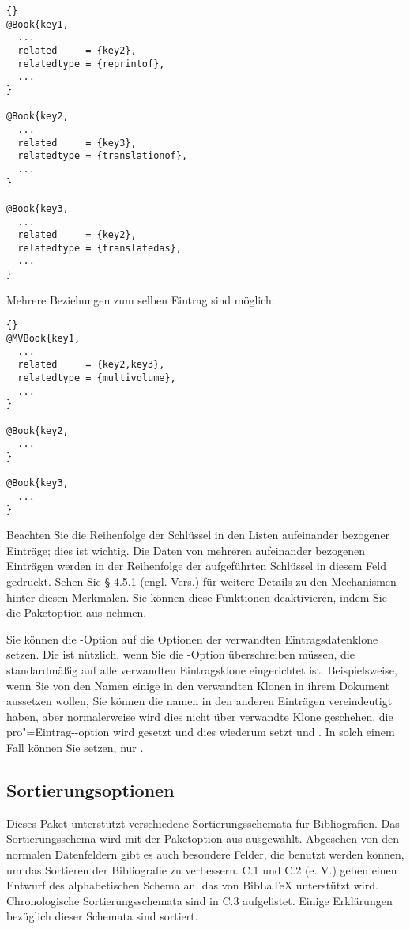\documentclass{ltxdockit}[2011/03/25]
\newcommand*{\biblatex}{BibLaTeX\xspace}
\begin{document}
\begin{lstlisting}[style=bibtex]{}
@Book{key1,
  ...
  related     = {key2},
  relatedtype = {reprintof},
  ...
}

@Book{key2,
  ...
  related     = {key3},
  relatedtype = {translationof},
  ...
}

@Book{key3,
  ...
  related     = {key2},
  relatedtype = {translatedas},
  ...
}
\end{lstlisting}
%
Mehrere Beziehungen zum selben Eintrag sind möglich:
\begin{lstlisting}[style=bibtex]{}
@MVBook{key1,
  ...
  related     = {key2,key3},
  relatedtype = {multivolume},
  ...
}

@Book{key2,
  ...
}

@Book{key3,
  ...
}
\end{lstlisting}
%
Beachten Sie die Reihenfolge der Schlüssel in den Listen aufeinander bezogener 
Einträge; dies ist wichtig. Die Daten von mehreren  aufeinander bezogenen Einträgen werden in der Reihenfolge der aufgeführten Schlüssel in diesem Feld gedruckt.
Sehen Sie %
§ 4.5.1 (engl. Vers.) für weitere Details zu den Mechanismen hinter diesen Merkmalen. Sie können diese Funktionen deaktivieren, indem Sie die Paketoption  aus  nehmen.

Sie können die -Option auf die Optionen der verwandten
Eintragsdatenklone setzen. Die ist nützlich, wenn Sie die -Option
überschreiben müssen, die standardmäßig auf alle verwandten Eintragsklone eingerichtet ist. Beispielsweise, wenn Sie von den Namen einige in den verwandten Klonen in ihrem Dokument aussetzen wollen, Sie können die namen in den anderen Einträgen vereindeutigt haben, aber normalerweise wird dies nicht über verwandte Klone geschehen, die  pro"=Eintrag--option wird gesetzt und
dies wiederum setzt  und . In solch einem Fall können Sie  setzen, nur .

\subsection{Sortierungsoptionen} \label{use:srt}

Dieses Paket unterstützt verschiedene Sortierungsschemata für
Bibliografien.
Das Sortierungsschema wird  mit der Paketoption  aus
 ausgewählt. Abgesehen von den normalen
Datenfeldern gibt es auch
besondere Felder, die benutzt werden können, um das Sortieren der
Bibliografie zu verbessern. C.1 und C.2 (e. V.) %
geben einen Entwurf
des alphabetischen Schema an, das von \biblatex unterstützt wird.
Chronologische Sortierungsschemata sind in C.3 %
aufgelistet. Einige Erklärungen bezüglich dieser Schemata sind sortiert.        
\end{document}
